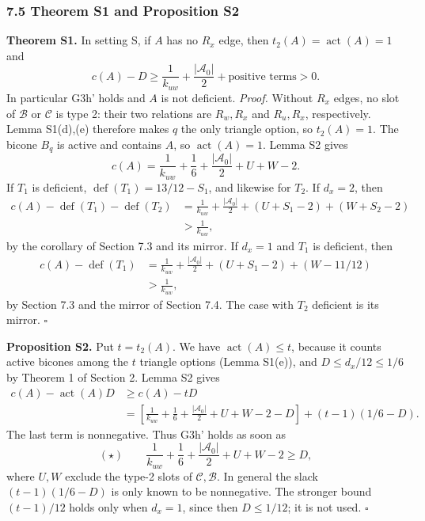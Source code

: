 \subsubsection*{7.5 Theorem S1 and Proposition S2}
\textbf{Theorem S1.} In setting S, if $A$ has no $R_x$ edge, then $t_2(A)=\operatorname{act}(A)=1$ and
\[
 c(A)-D\ge\frac1{k_{uw}}+\frac{|\mathcal A_0|}2+\text{positive terms}>0.
\]
In particular G3h' holds and $A$ is not deficient.
\emph{Proof.} Without $R_x$ edges, no slot of $\mathcal B$ or $\mathcal C$ is type 2: their two relations are $R_w,R_x$ and $R_u,R_x$, respectively. Lemma S1(d),(e) therefore makes $q$ the only triangle option, so $t_2(A)=1$. The bicone $B_q$ is active and contains $A$, so $\operatorname{act}(A)=1$. Lemma S2 gives
\[
 c(A)=\frac1{k_{uw}}+\frac16+\frac{|\mathcal A_0|}2+U+W-2.
\]
If $T_1$ is deficient, $\operatorname{def}(T_1)=13/12-S_1$, and likewise for $T_2$. If $d_x=2$, then
\[
\begin{aligned}
 c(A)-\operatorname{def}(T_1)-\operatorname{def}(T_2)
 &=\frac1{k_{uw}}+\frac{|\mathcal A_0|}2+(U+S_1-2)+(W+S_2-2)\\
 &>\frac1{k_{uw}},
\end{aligned}
\]
by the corollary of Section 7.3 and its mirror. If $d_x=1$ and $T_1$ is deficient, then
\[
\begin{aligned}
 c(A)-\operatorname{def}(T_1)
 &=\frac1{k_{uw}}+\frac{|\mathcal A_0|}2+(U+S_1-2)+(W-11/12)\\
 &>\frac1{k_{uw}},
\end{aligned}
\]
by Section 7.3 and the mirror of Section 7.4. The case with $T_2$ deficient is its mirror. \hfill$\square$

\textbf{Proposition S2.} Put $t=t_2(A)$. We have $\operatorname{act}(A)\le t$, because it counts active bicones among the $t$ triangle options (Lemma S1(e)), and $D\le d_x/12\le1/6$ by Theorem 1 of Section 2. Lemma S2 gives
\[
\begin{aligned}
 c(A)-\operatorname{act}(A)D&\ge c(A)-tD\\
 &=\left[\frac1{k_{uw}}+\frac16+\frac{|\mathcal A_0|}2+U+W-2-D\right]
    +(t-1)(1/6-D).
\end{aligned}
\]
The last term is nonnegative. Thus G3h' holds as soon as
\[
 (\star)\qquad \frac1{k_{uw}}+\frac16+\frac{|\mathcal A_0|}2+U+W-2\ge D,
\]
where $U,W$ exclude the type-2 slots of $\mathcal C,\mathcal B$. In general the slack $(t-1)(1/6-D)$ is only known to be nonnegative. The stronger bound $(t-1)/12$ holds only when $d_x=1$, since then $D\le1/12$; it is not used. \hfill$\square$

